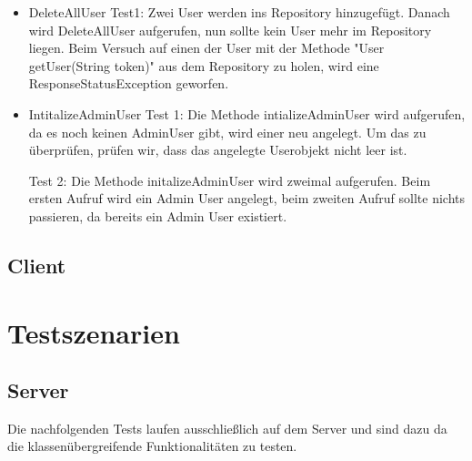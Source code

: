 \documentclass[a4paper]{scrreprt}
\begin{document}
\begin{itemize}
\begin{itemize}
\item DeleteAllUser
Test1: Zwei User werden ins Repository hinzugefügt. Danach wird DeleteAllUser aufgerufen, nun sollte kein User mehr im Repository liegen. Beim Versuch auf einen der User mit der Methode "User getUser(String token)" aus dem Repository zu holen, wird eine ResponseStatusException geworfen. 

\item IntitalizeAdminUser
Test 1: Die Methode intializeAdminUser wird aufgerufen, da es noch keinen AdminUser gibt, wird einer neu angelegt. Um das zu überprüfen, prüfen wir, dass das angelegte Userobjekt nicht leer ist.

Test 2: Die Methode initalizeAdminUser wird zweimal aufgerufen. Beim ersten Aufruf wird ein Admin User angelegt, beim zweiten Aufruf sollte nichts passieren, da bereits ein Admin User existiert. 
\end{itemize}
\end{itemize}

\section{Client}

\chapter{Testszenarien}
\section{Server}

Die nachfolgenden Tests laufen ausschließlich auf dem Server und sind dazu da die klassenübergreifende Funktionalitäten zu testen.\\
\end{document}
